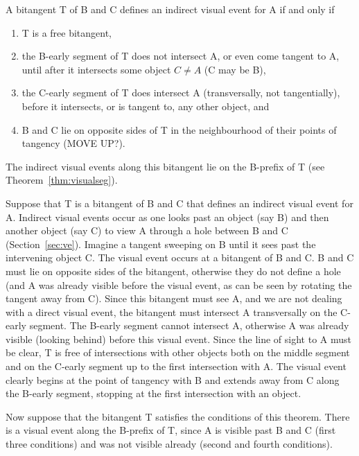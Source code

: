 \documentclass[12pt]{article}
\begin{document}
\begin{theorem}
\label{thm:indirectve}
A bitangent T of B and C defines an indirect visual event for A if and only if
\begin{enumerate}
\item T is a free bitangent,
\item the B-early segment of T does not intersect A, or even come tangent to A, 
      until after it intersects some object $C \neq A$ (C may be B), 
\item the C-early segment of T does intersect A (transversally, not tangentially), 
      before it intersects, or is tangent to, any other object, and
\item B and C lie on opposite sides of T in the neighbourhood of their points of tangency
      (MOVE UP?).
\end{enumerate}
The indirect visual events along this bitangent lie on the B-prefix of T
(see Theorem~\ref{thm:visualseg}).
\end{theorem}
\prf
Suppose that T is a bitangent of B and C that defines an indirect visual event for A.
Indirect visual events occur as one looks past an object (say B) and then another object
(say C) to view A through a hole between B and C (Section~\ref{sec:ve}).
Imagine a tangent sweeping on B until it sees past the intervening object C.
The visual event occurs at a bitangent of B and C.
B and C must lie on opposite sides of the bitangent,
otherwise they do not define a hole (and A was already visible before the visual event,
as can be seen by rotating the tangent away from C).
Since this bitangent must see A, and we are not dealing with a direct visual event,
the bitangent must intersect A transversally on the C-early segment.
The B-early segment cannot intersect A, otherwise A was already visible (looking behind)
before this visual event.
Since the line of sight to A must be clear, T is free of intersections with other objects
both on the middle segment and on the C-early segment up to the first
intersection with A.
The visual event clearly begins at the point of tangency with B and extends away from C
along the B-early segment, stopping at the first intersection with an object.

Now suppose that the bitangent T satisfies the conditions of this theorem.
There is a visual event along the B-prefix of T,
since A is visible past B and C (first three conditions) and was not visible already
(second and fourth conditions).
\QED
\end{document}
